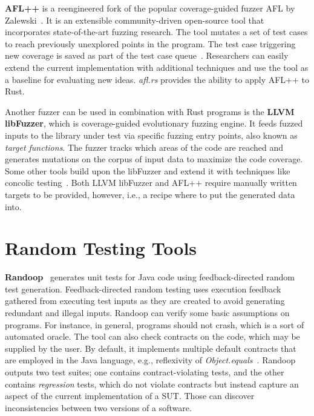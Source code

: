 \documentclass[paper=a4,%
  twoside,%
  BCOR4mm,%
  abstract=true,%
  toc=bibliography,%
  chapterprefix=true,%
  toc=bibliographynumbered,%
  open=right,%
  english,%
  pagesize=pdftex]{scrreprt}
\begin{document}
\textbf{AFL++} is a reengineered fork of the popular coverage-guided fuzzer \textsc{AFL} by Zalewski~\cite{Zalewski2014}. It is an extensible community-driven open-source tool that incorporates state-of-the-art fuzzing research. The tool mutates a set of test cases to reach previously unexplored points in the program. The test case triggering new coverage is saved as part of the test case queue~\cite{Fioraldi2020}. Researchers can easily extend the current implementation with additional techniques and use the tool as a baseline for evaluating new ideas. \textit{afl.rs} provides the ability to apply \textsc{AFL++} to Rust.

Another fuzzer can be used in combination with Rust programs is the \textbf{LLVM libFuzzer}, which is coverage-guided evolutionary fuzzing engine. It feeds fuzzed inputs to the library under test via specific fuzzing entry points, also known as \textit{target functions}. The fuzzer tracks which areas of the code are reached and generates mutations on the corpus of input data to maximize the code coverage. Some other tools build upon the libFuzzer and extend it with techniques like concolic testing~\cite{Rocha2020,Le2019}. Both LLVM libFuzzer and \textsc{AFL++} require manually written targets to be provided, however, i.e., a recipe where to put the generated data into.

\section{Random Testing Tools}
\textbf{Randoop}~\cite{Pacheco_2007} generates unit tests for Java code using feedback-directed random test generation. Feedback-directed random testing uses execution feedback gathered from executing test inputs as they are created to avoid generating redundant and illegal inputs. Randoop can verify some basic assumptions on programs. For instance, in general, programs should not crash, which is a sort of automated oracle. The tool can also check  contracts on the code, which may be supplied by the user. By default, it implements multiple default contracts that are employed in the Java language, e.g., reflexivity of \textit{Object.equals}~\cite{Fraser2013}. Randoop outputs two test suites; one contains contract-violating tests, and the other contains \textit{regression} tests, which do not violate contracts but instead capture an aspect of the current implementation of a \ac{SUT}. Those can discover inconsistencies between two versions of a software.


\clearpage
\end{document}
